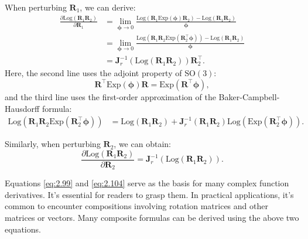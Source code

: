 When perturbing $\mathbf{R}_1$, we can derive:
\begin{equation}\label{eq:2.99}
\begin{aligned}
	\frac{{\partial \mathrm{Log} \left( {{\mathbf{R}_1}{\mathbf{R}_2}} \right)}}{{\partial {\mathbf{R}_1}}} &= \mathop {\lim 
	}\limits_{\boldsymbol{\phi}  \to 0} \frac{{\mathrm{Log} \left( {{\mathbf{R}_1}\mathrm{Exp} \left( \boldsymbol{\phi}  \right){\mathbf{R}_2}} \right) - \mathrm{Log} \left( {{\mathbf{R}_1}{\mathbf{R}_2}} 
			\right)}}{\boldsymbol{\phi} }\\
	&= \mathop {\lim }\limits_{\boldsymbol{\phi}  \to 0} \frac{{\mathrm{Log} \left( {{\mathbf{R}_1}{\mathbf{R}_2} \mathrm{Exp}  
				\left( {\mathbf{R}_2^\top \boldsymbol{\phi} } \right)} \right) - \mathrm{Log} \left( 
			{{\mathbf{R}_1}{\mathbf{R}_2}} \right)}}{\boldsymbol{\phi} }\\
	&= \mathbf{J}_r^{ - 1}(\mathrm{Log}(\mathbf{R}_1 \mathbf{R}_2)) \mathbf{R}_2^\top.
\end{aligned}
\end{equation}
Here, the second line uses the adjoint property of $\mathrm{SO}(3)$:
\begin{equation}
\mathbf{R}^\top \mathrm{Exp} (\boldsymbol{\phi}) \mathbf{R} = \mathrm{Exp} (\mathbf{R}^\top 
\boldsymbol{\phi}),
\end{equation}
and the third line uses the first-order approximation of the Baker-Campbell-Hausdorff formula:
\begin{equation}
\begin{aligned}
	\mathrm{Log} \left( {{\mathbf{R}_1}{\mathbf{R}_2} \mathrm{Exp}  
		\left( {\mathbf{R}_2^\top \boldsymbol{\phi} } \right)} \right) &= \mathrm{Log}(\mathbf{R}_1 \mathbf{R}_2) + \mathbf{J}_r^{-1}(\mathbf{R}_1 \mathbf{R}_2) \mathrm{Log}( \mathrm{Exp}(\mathbf{R}_2^\top \boldsymbol{\phi})).
\end{aligned}
\end{equation}

Similarly, when perturbing $\mathbf{R}_2$, we can obtain:
\begin{equation}\label{eq:2.104}
	\frac{\partial \mathrm{Log} \left( {\mathbf{R}_1}{\mathbf{R}_2} \right)}{\partial {\mathbf{R}_2}} = \mathbf{J}_r^{ -1}(\mathrm{Log}(\mathbf{R}_1 \mathbf{R}_2)).
\end{equation}

Equations \eqref{eq:2.99} and \eqref{eq:2.104} serve as the basis for many complex function derivatives. It's essential for readers to grasp them. In practical applications, it's common to encounter compositions involving rotation matrices and other matrices or vectors. Many composite formulas can be derived using the above two equations.


